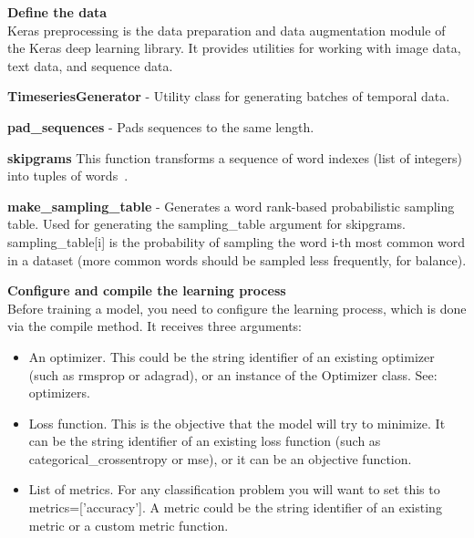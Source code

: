 \begin{description}
\item{ \textbf{Define the data}}\\
Keras preprocessing is the data preparation and data augmentation module of the Keras deep learning library. It provides utilities for working with image data, text data, and sequence data.

\begin{description}

\item{\textbf{TimeseriesGenerator}} - Utility class for generating batches of temporal data.
\item{\textbf{pad\_sequences}} - Pads sequences to the same length.
\item{\textbf{skipgrams}} This function transforms a sequence of word indexes (list of integers) into tuples of words~\cite{mikolov2013efficient}.
\item{\textbf{make\_sampling\_table}} - Generates a word rank-based probabilistic sampling table.  Used for generating the sampling\_table argument for skipgrams. sampling\_table[i] is the probability of sampling the word i-th most common word in a dataset (more common words should be sampled less frequently, for balance).

\end{description}

\item {\textbf{Configure and compile the learning process}}\\
Before training a model, you need to configure the learning process, which is done via the compile method. It receives three arguments:

\begin{itemize}
\item An optimizer. This could be the string identifier of an existing optimizer (such as rmsprop or adagrad), or an instance of the Optimizer class. See: optimizers.
\item Loss function. This is the objective that the model will try to minimize. It can be the string identifier of an existing loss function (such as categorical\_crossentropy or mse), or it can be an objective function. 
\item List of metrics. For any classification problem you will want to set this to metrics=['accuracy']. A metric could be the string identifier of an existing metric or a custom metric function.
\end{itemize}

\end{description}
